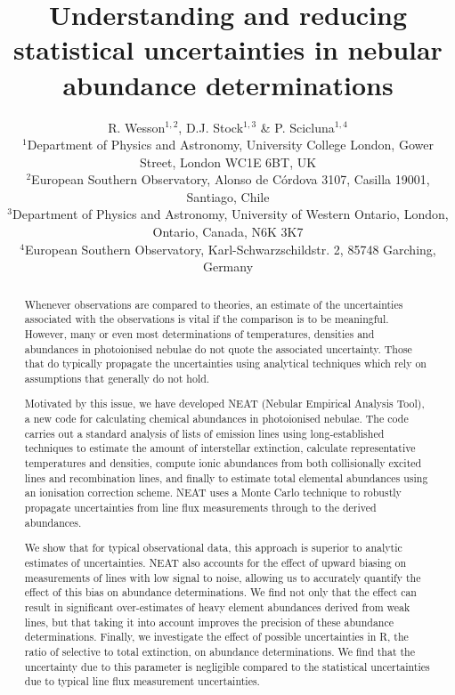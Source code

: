 \documentclass[useAMS,usenatbib]{mn2e}
\title[Statistical uncertainties in nebular abundances]{Understanding and reducing statistical uncertainties in nebular abundance determinations} %
\author[R. Wesson et al.]{R. Wesson$^{1,2}$, D.J. Stock$^{1,3}$ \& P. Scicluna$^{1,4}$\\
$^1$Department of Physics and Astronomy, University College London, Gower Street, London WC1E 6BT, UK\\
$^2$European Southern Observatory, Alonso de C\'ordova 3107, Casilla 19001, Santiago, Chile\\
$^3$Department of Physics and Astronomy, University of Western Ontario, London, Ontario, Canada, N6K 3K7\\
$^4$European Southern Observatory, Karl-Schwarzschildstr. 2, 85748 Garching, Germany\\ 
}
\begin{document}
\date{}

\pagerange{\pageref{firstpage}--\pageref{lastpage}} 

\maketitle

\label{firstpage}

\begin{abstract}
Whenever observations are compared to theories, an estimate of the uncertainties associated with the observations is vital if the comparison is to be meaningful.  However, many or even most determinations of temperatures, densities and abundances in photoionised nebulae do not quote the associated uncertainty.  Those that do typically propagate the uncertainties using analytical techniques which rely on assumptions that generally do not hold.

Motivated by this issue, we have developed NEAT (Nebular Empirical Analysis Tool), a new code for calculating chemical abundances in photoionised nebulae.  The code carries out a standard analysis of lists of emission lines using long-established techniques to estimate the amount of interstellar extinction, calculate representative temperatures and densities, compute ionic abundances from both collisionally excited lines and recombination lines, and finally to estimate total elemental abundances using an ionisation correction scheme.  NEAT uses a Monte Carlo technique to robustly propagate uncertainties from line flux measurements through to the derived abundances.

We show that for typical observational data, this approach is superior to analytic estimates of uncertainties.  NEAT also accounts for the effect of upward biasing on measurements of lines with low signal to noise, allowing us to accurately quantify the effect of this bias on abundance determinations.  We find not only that the effect can result in significant over-estimates of heavy element abundances derived from weak lines, but that taking it into account improves the precision of these abundance determinations.  Finally, we investigate the effect of possible uncertainties in R, the ratio of selective to total extinction, on abundance determinations.  We find that the uncertainty due to this parameter is negligible compared to the statistical uncertainties due to typical line flux measurement uncertainties.

\end{abstract}
\end{document}
